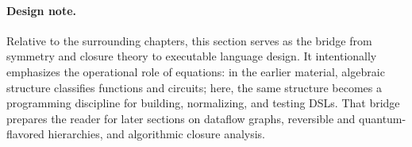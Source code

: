 \documentclass[11pt]{article}
\begin{document}
\paragraph{Design note.} Relative to the surrounding chapters, this section serves as the bridge from symmetry and closure theory to executable language design. It intentionally emphasizes the operational role of equations: in the earlier material, algebraic structure classifies functions and circuits; here, the same structure becomes a programming discipline for building, normalizing, and testing DSLs. That bridge prepares the reader for later sections on dataflow graphs, reversible and quantum-flavored hierarchies, and algorithmic closure analysis.
\end{document}
